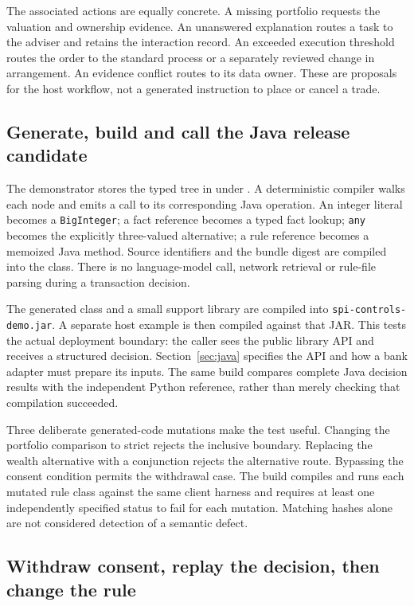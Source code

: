 The associated actions are equally concrete. A missing portfolio requests the
valuation and ownership evidence. An unanswered explanation routes a task to the
adviser and retains the interaction record. An exceeded execution threshold
routes the order to the standard process or a separately reviewed change in
arrangement. An evidence conflict routes to its data owner. These are proposals
for the host workflow, not a generated instruction to place or cancel a trade.

\subsection{Generate, build and call the Java release candidate}

The demonstrator stores the typed tree in 
under . A deterministic
compiler walks each node and emits a call to its corresponding Java operation.
An integer literal becomes a \texttt{BigInteger}; a fact reference becomes a
typed fact lookup; \texttt{any} becomes the explicitly three-valued alternative;
a rule reference becomes a memoized Java method. Source identifiers and the
bundle digest are compiled into the class. There is no language-model call,
network retrieval or rule-file parsing during a transaction decision.

The generated class and a small support library are compiled into
\texttt{spi-controls-demo.jar}. A separate host example is
then compiled against that JAR. This tests the actual deployment boundary:
the caller sees the public library API and receives a structured decision.
Section~\ref{sec:java} specifies the API and how a bank adapter must prepare
its inputs. The same build compares complete Java decision results with the
independent Python reference, rather than merely checking that compilation
succeeded.

Three deliberate generated-code mutations make the test useful. Changing the
portfolio comparison to strict rejects the inclusive boundary. Replacing the
wealth alternative with a conjunction rejects the alternative route. Bypassing
the consent condition permits the withdrawal case. The build compiles and runs
each mutated rule class against the same client harness and requires at least
one independently specified status to fail for each mutation. Matching hashes
alone are not considered detection of a semantic defect.

\subsection{Withdraw consent, replay the decision, then change the rule}

